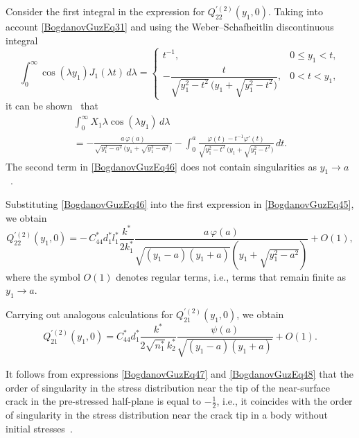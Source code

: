 Consider the first integral in the expression for
$Q_{22}^{\prime(2)}(y_{1},0)$. Taking into account
\eqref{BogdanovGuzEq31} and using the Weber--Schafheitlin discontinuous
integral~\cite{BogdanovGuz54}
\[
\int_{0}^{\infty}\cos(\lambda y_{1})J_{1}(\lambda t)\,d\lambda
=
\begin{cases}
	t^{-1}, & 0\le y_{1}<t,
	\\[6pt]
	-\dfrac{t}{\sqrt{y_{1}^{2}-t^{2}}\,
		\bigl(y_{1}+\sqrt{y_{1}^{2}-t^{2}}\bigr)},
	& 0<t<y_{1},
\end{cases}
\]
it can be shown~\cite{BogdanovGuz10} that
\begin{multline}
	\label{BogdanovGuzEq46}
	\int_{0}^{\infty}X_{1}\lambda\cos(\lambda y_{1})\,d\lambda
	\\
	=
	-\frac{a\,\varphi(a)}
	{\sqrt{y_{1}^{2}-a^{2}}\,
		\bigl(y_{1}+\sqrt{y_{1}^{2}-a^{2}}\bigr)}
	-
	\int_{0}^{a}
	\frac{\varphi(t)-t^{-1}\varphi'(t)}
	{\sqrt{y_{1}^{2}-t^{2}}\,
		\bigl(y_{1}+\sqrt{y_{1}^{2}-t^{2}}\bigr)}\,dt .
\end{multline}
%
The second term in \eqref{BogdanovGuzEq46} does not contain singularities as
$y_{1}\to a$~\cite{BogdanovGuz53}.

Substituting \eqref{BogdanovGuzEq46} into the first expression in
\eqref{BogdanovGuzEq45}, we obtain
\begin{equation}
	\label{BogdanovGuzEq47}
	Q_{22}^{\prime(2)}(y_{1},0)
	=
	-\,C_{44}^{*} d_{1}^{*} l_{1}^{*}
	\frac{k^{*}}{2k_{1}^{*}}
	\frac{a\,\varphi(a)}
	{\sqrt{(y_{1}-a)(y_{1}+a)}
		\left(y_{1}+\sqrt{y_{1}^{2}-a^{2}}\right)}
	+O(1),
\end{equation}
where the symbol $O(1)$ denotes regular terms, i.e., terms that remain finite
as $y_{1}\to a$.

Carrying out analogous calculations for
$Q_{21}^{\prime(2)}(y_{1},0)$, we obtain
\begin{equation}
	\label{BogdanovGuzEq48}
	Q_{21}^{\prime(2)}(y_{1},0)
	=
	C_{44}^{*} d_{1}^{*}
	\frac{k^{*}}{2\sqrt{n_{1}^{*}}\,k_{2}^{*}}
	\frac{\psi(a)}
	{\sqrt{(y_{1}-a)(y_{1}+a)}}
	+O(1).
\end{equation}

It follows from expressions \eqref{BogdanovGuzEq47} and \eqref{BogdanovGuzEq48}
that the order of singularity in the stress distribution near the tip of the
near-surface crack in the pre-stressed half-plane is equal to $-\frac12$, i.e., it
coincides with the order of singularity in the stress distribution near the
crack tip in a body without initial stresses~\cite{BogdanovGuz16}.

